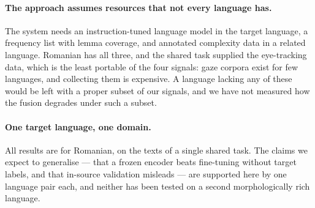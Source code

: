 \documentclass[11pt]{article}
\begin{document}
\paragraph{The approach assumes resources that not every language has.}
The system needs an instruction-tuned language model in the target
language, a frequency list with lemma coverage, and annotated
complexity data in a related language. Romanian has all three, and the
shared task supplied the eye-tracking data, which is the least portable
of the four signals: gaze corpora exist for few languages, and
collecting them is expensive. A language lacking any of these would be
left with a proper subset of our signals, and we have not measured how
the fusion degrades under such a subset.

\paragraph{One target language, one domain.}
All results are for Romanian, on the texts of a single shared task.
The claims we expect to generalise --- that a frozen encoder beats
fine-tuning without target labels, and that in-source validation
misleads --- are supported here by one language pair each, and neither
has been tested on a second morphologically rich language.


\end{document}
